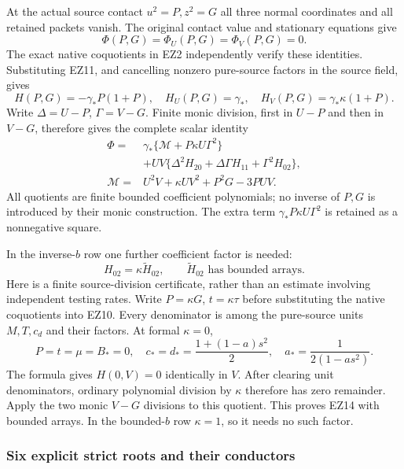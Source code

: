 At the actual source contact $u^2=P,z^2=G$ all three normal
coordinates and all retained packets vanish. The original contact
value and stationary equations give
\[
 \Phi(P,G)=\Phi_U(P,G)=\Phi_V(P,G)=0.                            \tag{EZ12}
\]
The exact native coquotients in EZ2 independently verify these
identities. Substituting EZ11, and cancelling nonzero pure-source
factors in the source field, gives
\[
 H(P,G)=-\gamma_*P(1+P),\quad
 H_U(P,G)=\gamma_*,\quad
 H_V(P,G)=\gamma_*\kappa(1+P).
\]
Write $\Delta=U-P$, $\Gamma=V-G$.
Finite monic division, first in $U-P$ and then in $V-G$,
therefore gives the complete scalar identity
\[
\begin{split}
 \Phi={}&\gamma_*\{\mathcal M+P\kappa U\Gamma^2\}\\
 &+UV\{\Delta^2H_{20}+\Delta\Gamma H_{11}
                                      +\Gamma^2H_{02}\},\\
 \mathcal M={}&U^2V+\kappa UV^2+P^2G-3PUV .
\end{split}                                                     \tag{EZ13}
\]
All quotients are finite bounded coefficient polynomials; no
inverse of $P,G$ is introduced by their monic construction.
The extra term $\gamma_*P\kappa U\Gamma^2$ is retained as a
nonnegative square.

In the inverse-$b$ row one further coefficient factor is needed:
\[
                         H_{02}=\kappa\widetilde H_{02},
 \qquad\widetilde H_{02}\text{ has bounded arrays}.              \tag{EZ14}
\]
Here is a finite source-division certificate, rather than an
estimate involving independent testing rates. Write
$P=\kappa G$, $t=\kappa\tau$ before substituting the native
coquotients into EZ10. Every denominator is among the pure-source
units $M,T,c_d$ and their factors. At formal $\kappa=0$,
\[
 P=t=\mu=B_*=0,\quad
 c_*=d_*=\frac{1+(1-a)s^2}{2},\quad
 a_*=\frac1{2(1-as^2)} .
\]
The formula gives $H(0,V)=0$ identically in $V$.
After clearing unit denominators, ordinary polynomial division
by $\kappa$ therefore has zero remainder. Apply the two monic
$V-G$ divisions to this quotient. This proves EZ14 with bounded
arrays. In the bounded-$b$ row $\kappa=1$, so it needs no such
factor.

\subsubsection*{Six explicit strict roots and their conductors}

